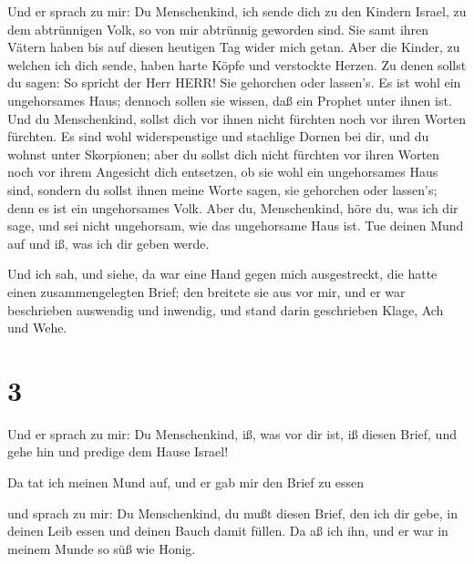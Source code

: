  Und er sprach zu mir: Du Menschenkind, ich sende dich zu
den Kindern Israel, zu dem abtrünnigen Volk, so von mir abtrünnig
geworden sind. Sie samt ihren Vätern haben bis auf diesen heutigen Tag
wider mich getan.  Aber die Kinder, zu welchen ich dich
sende, haben harte Köpfe und verstockte Herzen. Zu denen sollst du
sagen: So spricht der Herr HERR!  Sie gehorchen oder
lassen's. Es ist wohl ein ungehorsames Haus; dennoch sollen sie wissen,
daß ein Prophet unter ihnen ist.  Und du Menschenkind,
sollst dich vor ihnen nicht fürchten noch vor ihren Worten fürchten. Es
sind wohl widerspenstige und stachlige Dornen bei dir, und du wohnst
unter Skorpionen; aber du sollst dich nicht fürchten vor ihren Worten
noch vor ihrem Angesicht dich entsetzen, ob sie wohl ein ungehorsames
Haus sind,  sondern du sollst ihnen meine Worte sagen, sie
gehorchen oder lassen's; denn es ist ein ungehorsames Volk. 
Aber du, Menschenkind, höre du, was ich dir sage, und sei nicht
ungehorsam, wie das ungehorsame Haus ist. Tue deinen Mund auf und iß,
was ich dir geben werde.

 Und ich sah, und siehe, da war eine Hand gegen mich
ausgestreckt, die hatte einen zusammengelegten Brief;  den
breitete sie aus vor mir, und er war beschrieben auswendig und inwendig,
und stand darin geschrieben Klage, Ach und Wehe.

\hypertarget{section-2}{%
\section{3}\label{section-2}}

 Und er sprach zu mir: Du Menschenkind, iß, was vor dir ist,
iß diesen Brief, und gehe hin und predige dem Hause Israel!

 Da tat ich meinen Mund auf, und er gab mir den Brief zu
essen

 und sprach zu mir: Du Menschenkind, du mußt diesen Brief,
den ich dir gebe, in deinen Leib essen und deinen Bauch damit füllen. Da
aß ich ihn, und er war in meinem Munde so süß wie Honig.

